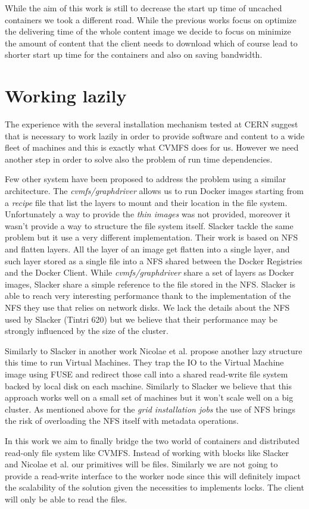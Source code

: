 While the aim of this work is still to decrease the start up time of uncached
containers we took a different road. While the previous works focus on optimize
the delivering time of the whole content image we decide to focus on minimize
the amount of content that the client needs to download which of course lead to
shorter start up time for the containers and also on saving bandwidth.

\section{Working lazily}

The experience with the several installation mechanism tested at CERN suggest
that is necessary to work lazily in order to provide software and content to a
wide fleet of machines and this is exactly what CVMFS does for us. However we
need another step in order to solve also the problem of run time dependencies.

Few other system have been proposed to address the problem using a similar
architecture. The \textit{cvmfs/graphdriver} \cite{graphdriver-plugin} allows
us to run Docker images starting from a \textit{recipe} file that  list the
layers to mount and their location in the file system. Unfortunately a way to
provide the \textit{thin images} was not provided, moreover it wasn't provide a
way to structure the file system itself. Slacker \cite{slacker} tackle the same
problem but it use a very different implementation. Their work is based on NFS
and flatten layers. All the layer of an image get flatten into a single layer,
and such layer stored as a single file into a NFS shared between the Docker
Registries and the Docker Client. While \textit{cvmfs/graphdriver} share a set
of layers as Docker images, Slacker share a simple reference to the file stored
in the NFS. Slacker is able to reach very interesting performance thank to the
implementation of the NFS they use that relies on network disks. We lack the
details about the NFS used by Slacker (Tintri 620) but we believe that their
performance may be strongly influenced by the size of the cluster.

Similarly to Slacker in another work Nicolae et al. \cite{back-forth} propose
another lazy structure this time to run Virtual Machines. They trap the IO to
the Virtual Machine image using FUSE and redirect those call into a shared
read-write file system backed by local disk on each machine.  Similarly to
Slacker we believe that this approach works well on a small set of machines but
it won't scale well on a big cluster. As mentioned above for the \textit{grid
installation jobs} the use of NFS brings the risk of overloading the NFS itself
with metadata operations.

In this work we aim to finally bridge the two world of containers and
distributed read-only file system like CVMFS. Instead of working with blocks
like Slacker and Nicolae et al. our primitives will be files. Similarly we are
not going to provide a read-write interface to the worker node since this
will definitely impact the scalability of the solution given the necessities to
implements locks. The client will only be able to read the files.

